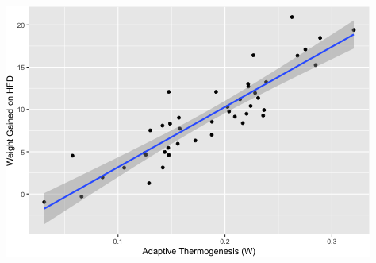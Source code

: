 \documentclass[]{article}
\newenvironment{Shaded}{\begin{snugshade}}{\end{snugshade}}
\newcommand{\DataTypeTok}[1]{\textcolor[rgb]{0.13,0.29,0.53}{#1}}
\newcommand{\KeywordTok}[1]{\textcolor[rgb]{0.13,0.29,0.53}{\textbf{#1}}}
\newcommand{\NormalTok}[1]{#1}
\newcommand{\OperatorTok}[1]{\textcolor[rgb]{0.81,0.36,0.00}{\textbf{#1}}}
\newcommand{\StringTok}[1]{\textcolor[rgb]{0.31,0.60,0.02}{#1}}
\begin{document}
\includegraphics{figures/adaptive-thermogenesis-weight-1.png}

\begin{Shaded}
\end{Shaded}
\end{document}
